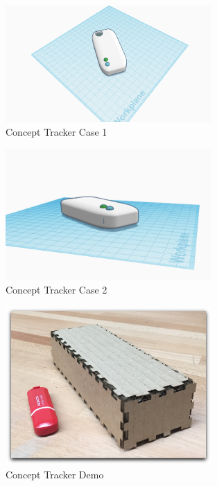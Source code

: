 \documentclass[12pt,a4paper]{article}
\begin{document}
        \begin{figure}[H]
          \centering
          \includegraphics[width=0.7\textwidth]{../assets/design-tracker-case-design-1.jpg}
          \caption{Concept Tracker Case 1}
          \label{fig:Concept Tracker Case 1}
        \end{figure}

        \begin{figure}[H]
          \centering
          \includegraphics[width=0.7\textwidth]{../assets/design-tracker-case-design-2.jpg}
          \caption{Concept Tracker Case 2}
          \label{fig:Concept Tracker Case 2}
        \end{figure}

        \begin{figure}[H]
          \centering
          \includegraphics[width=0.7\textwidth]{../assets/design-tracker-case-demo.jpg}
          \caption{Concept Tracker Demo}
          \label{fig:Concept Tracker Demo}
        \end{figure}
\end{document}
